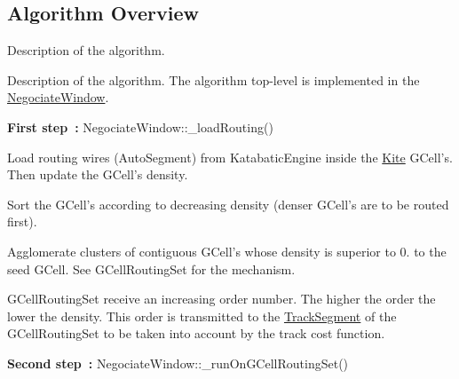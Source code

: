 \hypertarget{group__AlgorithmOverview}{\subsection{Algorithm Overview}
\label{group__AlgorithmOverview}
}


Description of the algorithm.  


Description of the algorithm. The algorithm top-\/level is implemented in the {\ttfamily \hyperlink{classKite_1_1NegociateWindow}{Negociate\-Window}}.

{\bfseries First step~\-:} Negociate\-Window\-::\-\_\-load\-Routing() 
\begin{DoxyEnumerate}
\item Load routing wires ({\ttfamily Auto\-Segment}) from {\ttfamily Katabatic\-Engine} inside the \hyperlink{namespaceKite}{Kite} {\ttfamily G\-Cell's}. Then update the {\ttfamily G\-Cell's} density. 
\item Sort the {\ttfamily G\-Cell's} according to decreasing density (denser {\ttfamily G\-Cell's} are to be routed first). 
\item Agglomerate clusters of contiguous G\-Cell's whose density is superior to 0. to the seed G\-Cell. See {\ttfamily G\-Cell\-Routing\-Set} for the mechanism.

G\-Cell\-Routing\-Set receive an increasing order number. The higher the order the lower the density. This order is transmitted to the {\ttfamily \hyperlink{classKite_1_1TrackSegment}{Track\-Segment}} of the {\ttfamily G\-Cell\-Routing\-Set} to be taken into account by the track cost function. 
\end{DoxyEnumerate}

{\bfseries Second step~\-:} {\ttfamily Negociate\-Window\-::\-\_\-run\-On\-G\-Cell\-Routing\-Set()} 

